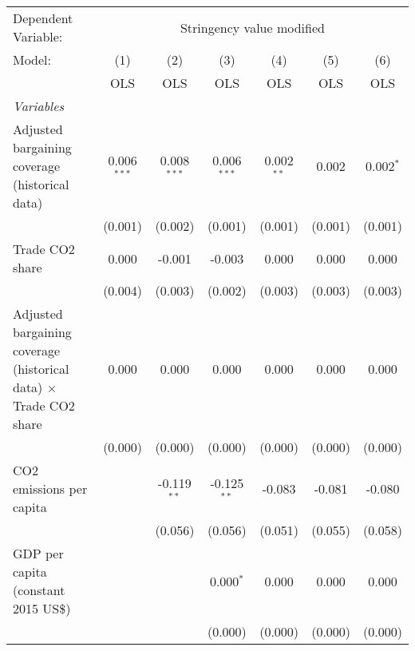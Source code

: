 
\begingroup
\centering
\begin{tabular}{lcccccc}
   \toprule
   Dependent Variable: & \multicolumn{6}{c}{Stringency value modified}\\
   Model:                                                                   & (1)           & (2)           & (3)           & (4)          & (5)     & (6)\\  
                                                                            &  OLS          & OLS           & OLS           & OLS          & OLS     & OLS\\  
   \midrule
   \emph{Variables}\\
   Adjusted bargaining coverage (historical data)                           & 0.006$^{***}$ & 0.008$^{***}$ & 0.006$^{***}$ & 0.002$^{**}$ & 0.002   & 0.002$^{*}$\\   
                                                                            & (0.001)       & (0.002)       & (0.001)       & (0.001)      & (0.001) & (0.001)\\   
   Trade CO2 share                                                          & 0.000         & -0.001        & -0.003        & 0.000        & 0.000   & 0.000\\   
                                                                            & (0.004)       & (0.003)       & (0.002)       & (0.003)      & (0.003) & (0.003)\\   
   Adjusted bargaining coverage (historical data) $\times$ Trade CO2 share  & 0.000         & 0.000         & 0.000         & 0.000        & 0.000   & 0.000\\   
                                                                            & (0.000)       & (0.000)       & (0.000)       & (0.000)      & (0.000) & (0.000)\\   
   CO2 emissions per capita                                                 &               & -0.119$^{**}$ & -0.125$^{**}$ & -0.083       & -0.081  & -0.080\\   
                                                                            &               & (0.056)       & (0.056)       & (0.051)      & (0.055) & (0.058)\\   
   GDP per capita (constant 2015 US\$)                                      &               &               & 0.000$^{*}$   & 0.000        & 0.000   & 0.000\\   
                                                                            &               &               & (0.000)       & (0.000)      & (0.000) & (0.000)\\   

\end{tabular}
